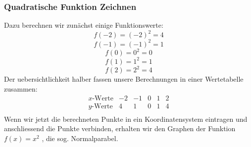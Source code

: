 \begin{multicols}{2}
    \subsubsection{Quadratische Funktion Zeichnen}
    \vspace{-4mm}
    Dazu berechnen wir zunächst einige Funktionswerte:
    \[f(-2) = (-2)^2 = 4\]
    \[f(-1) = (-1)^2 = 1\]
    \[f(0) = 0^2 = 0\]
    \[f(1) = 1^2 = 1\]
    \[f(2) = 2^2 = 4\]
    Der uebersichtlichkeit halber fassen unsere Berechnungen in einer Wertetabelle zusammen:
    \[ \begin{array}{r|c|c|c|c|c} x\text{-Werte} & -2 & -1 & 0 & 1 & 2 \\ \hline y\text{-Werte} & 4 & 1 & 0 & 1 & 4 \\ \end{array}\]
    Wenn wir jetzt die berechneten Punkte in ein Koordinatensystem eintragen und anschliessend die Punkte verbinden, erhalten wir den Graphen der Funktion $f(x)=x^2$ , die sog. Normalparabel.


\end{multicols}
